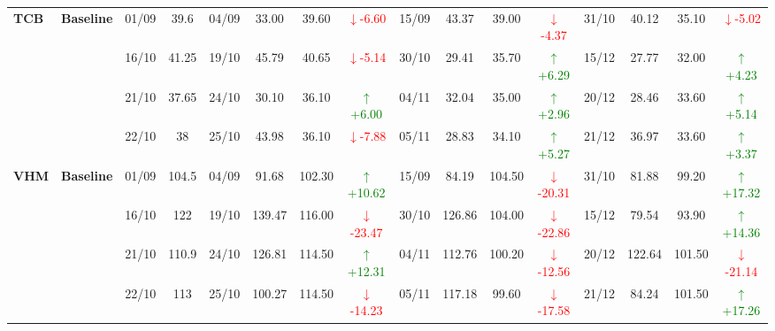 \documentclass{ieeeaccess}
\begin{document}
{\begin{longtable}{llcc|cccc|cccc|cccc}
\multirow{4}{*}{\textbf{TCB}}
& \textbf{Baseline}
& 01/09 & 39.6 & 04/09 & 33.00 & 39.60 & \textcolor{red}{\(\downarrow\)-6.60} & 15/09 & 43.37 & 39.00 & \textcolor{red}{\(\downarrow\)-4.37} & 31/10 & 40.12 & 35.10 & \textcolor{red}{\(\downarrow\)-5.02} \\
& & 16/10 & 41.25 & 19/10 & 45.79 & 40.65 & \textcolor{red}{\(\downarrow\)-5.14} & 30/10 & 29.41 & 35.70 & \textcolor{green}{\(\uparrow\)+6.29} & 15/12 & 27.77 & 32.00 & \textcolor{green}{\(\uparrow\)+4.23} \\
& & 21/10 & 37.65 & 24/10 & 30.10 & 36.10 & \textcolor{green}{\(\uparrow\)+6.00} & 04/11 & 32.04 & 35.00 & \textcolor{green}{\(\uparrow\)+2.96} & 20/12 & 28.46 & 33.60 & \textcolor{green}{\(\uparrow\)+5.14} \\
& & 22/10 & 38 & 25/10 & 43.98 & 36.10 & \textcolor{red}{\(\downarrow\)-7.88} & 05/11 & 28.83 & 34.10 & \textcolor{green}{\(\uparrow\)+5.27} & 21/12 & 36.97 & 33.60 & \textcolor{green}{\(\uparrow\)+3.37} \\
\midrule

\multirow{4}{*}{\textbf{VHM}}
& \textbf{Baseline}
& 01/09 & 104.5 & 04/09 & 91.68 & 102.30 & \textcolor{green}{\(\uparrow\)+10.62} & 15/09 & 84.19 & 104.50 & \textcolor{red}{\(\downarrow\)-20.31} & 31/10 & 81.88 & 99.20 & \textcolor{green}{\(\uparrow\)+17.32} \\
& & 16/10 & 122 & 19/10 & 139.47 & 116.00 & \textcolor{red}{\(\downarrow\)-23.47} & 30/10 & 126.86 & 104.00 & \textcolor{red}{\(\downarrow\)-22.86} & 15/12 & 79.54 & 93.90 & \textcolor{green}{\(\uparrow\)+14.36} \\
& & 21/10 & 110.9 & 24/10 & 126.81 & 114.50 & \textcolor{green}{\(\uparrow\)+12.31} & 04/11 & 112.76 & 100.20 & \textcolor{red}{\(\downarrow\)-12.56} & 20/12 & 122.64 & 101.50 & \textcolor{red}{\(\downarrow\)-21.14} \\
& & 22/10 & 113 & 25/10 & 100.27 & 114.50 & \textcolor{red}{\(\downarrow\)-14.23} & 05/11 & 117.18 & 99.60 & \textcolor{red}{\(\downarrow\)-17.58} & 21/12 & 84.24 & 101.50 & \textcolor{green}{\(\uparrow\)+17.26} \\
\midrule


\end{longtable}}
\end{document}

